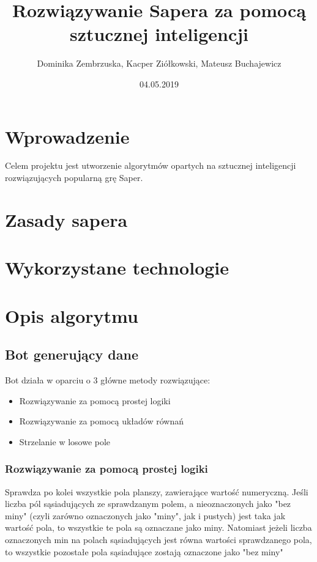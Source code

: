 \documentclass{article} %
\title{Rozwiązywanie Sapera za pomocą sztucznej inteligencji}
\date{04.05.2019}
\author{Dominika Zembrzuska, Kacper Ziółkowski, Mateusz Buchajewicz}
\begin{document}
\maketitle

\section{Wprowadzenie}
Celem projektu jest utworzenie algorytmów opartych na sztucznej inteligencji rozwiązujących popularną grę Saper.
\section{Zasady sapera}
\section{Wykorzystane technologie}
\section{Opis algorytmu}
\subsection{Bot generujący dane}

Bot działa w oparciu o 3 główne metody rozwiązujące:
\begin{itemize}
    \item{Rozwiązywanie za pomocą prostej logiki}
    \item{Rozwiązywanie za pomocą układów równań}
    \item{Strzelanie w losowe pole}    
\end{itemize}
\subsubsection{Rozwiązywanie za pomocą prostej logiki}
Sprawdza po kolei wszystkie pola planszy, zawierające wartość numeryczną. 
Jeśli liczba pól sąsiadujących ze sprawdzanym polem, a nieoznaczonych jako
"bez miny" (czyli zarówno oznaczonych jako "miny", jak i pustych) jest taka
jak wartość pola, to wszystkie te pola są oznaczane jako miny.
Natomiast jeżeli liczba oznaczonych min na polach sąsiadujących jest równa wartości 
sprawdzanego pola, to wszystkie pozostałe pola sąsiadujące zostają oznaczone jako "bez miny"
\newpage
\end{document}

